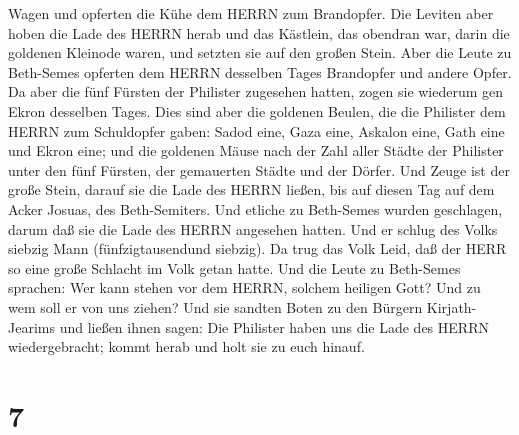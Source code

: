 Wagen und opferten die Kühe dem HERRN zum Brandopfer.  Die
Leviten aber hoben die Lade des HERRN herab und das Kästlein, das
obendran war, darin die goldenen Kleinode waren, und setzten sie auf den
großen Stein. Aber die Leute zu Beth-Semes opferten dem HERRN desselben
Tages Brandopfer und andere Opfer.  Da aber die fünf
Fürsten der Philister zugesehen hatten, zogen sie wiederum gen Ekron
desselben Tages.  Dies sind aber die goldenen Beulen, die
die Philister dem HERRN zum Schuldopfer gaben: Sadod eine, Gaza eine,
Askalon eine, Gath eine und Ekron eine;  und die goldenen
Mäuse nach der Zahl aller Städte der Philister unter den fünf Fürsten,
der gemauerten Städte und der Dörfer. Und Zeuge ist der große Stein,
darauf sie die Lade des HERRN ließen, bis auf diesen Tag auf dem Acker
Josuas, des Beth-Semiters.  Und etliche zu Beth-Semes
wurden geschlagen, darum daß sie die Lade des HERRN angesehen hatten.
Und er schlug des Volks siebzig Mann (fünfzigtausendund siebzig). Da
trug das Volk Leid, daß der HERR so eine große Schlacht im Volk getan
hatte.  Und die Leute zu Beth-Semes sprachen: Wer kann
stehen vor dem HERRN, solchem heiligen Gott? Und zu wem soll er von uns
ziehen?  Und sie sandten Boten zu den Bürgern
Kirjath-Jearims und ließen ihnen sagen: Die Philister haben uns die Lade
des HERRN wiedergebracht; kommt herab und holt sie zu euch hinauf.

\hypertarget{section-6}{%
\section{7}\label{section-6}}

